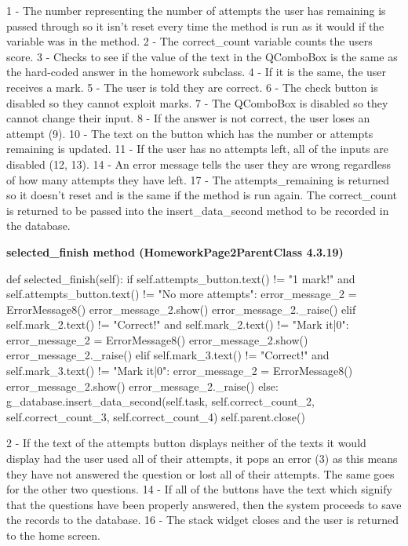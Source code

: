 1 - The number representing the number of attempts the user has remaining is passed through so it isn't reset every time the method is run as it would if the variable was in the method.
2 - The correct\_count variable counts the users score.
3 - Checks to see if the value of the text in the QComboBox is the same as the hard-coded answer in the homework subclass.
4 - If it is the same, the user receives a mark.
5 - The user is told they are correct.
6 - The check button is disabled so they cannot exploit marks.
7 - The QComboBox is disabled so they cannot change their input.
8 - If the answer is not correct, the user loses an attempt (9).
10 - The text on the button which has the number or attempts remaining is updated.
11 - If the user has no attempts left, all of the inputs are disabled (12, 13).
14 - An error message tells the user they are wrong regardless of how many attempts they have left.
17 - The attempts\_remaining is returned so it doesn't reset and is the same if the method is run again. The correct\_count is returned to be passed into the insert\_data\_second method to be recorded in the database.

\textbf{selected\_finish method (HomeworkPage2ParentClass 4.3.19)}

\begin{python}
def selected_finish(self):
        if self.attempts_button.text() != "1 mark!" and self.attempts_button.text() != "No more attempts":
            error_message_2 = ErrorMessage8()
            error_message_2.show()
            error_message_2._raise()
        elif self.mark_2.text() != "Correct!" and self.mark_2.text() != "Mark it|0":
            error_message_2 = ErrorMessage8()
            error_message_2.show()
            error_message_2._raise()
        elif self.mark_3.text() != "Correct!" and self.mark_3.text() != "Mark it|0":
            error_message_2 = ErrorMessage8()
            error_message_2.show()
            error_message_2._raise()
        else:
            g_database.insert_data_second(self.task, self.correct_count_2, self.correct_count_3, self.correct_count_4)
            self.parent.close()
\end{python}

2 - If the text of the attempts button displays neither of the texts it would display had the user used all of their attempts, it pops an error (3) as this means they have not answered the question or lost all of their attempts. The same goes for the other two questions.
14 - If all of the buttons have the text which signify that the questions have been properly answered, then the system proceeds to save the records to the database.
16 - The stack widget closes and the user is returned to the home screen.


